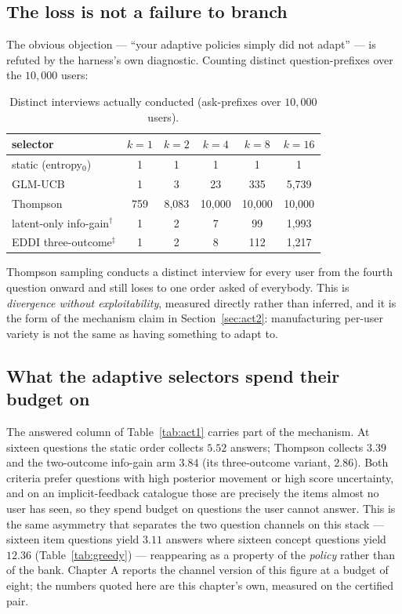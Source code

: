 \documentclass[11pt]{article}
\begin{document}
\subsection{The loss is not a failure to branch}

The obvious objection --- ``your adaptive policies simply did not adapt'' --- is refuted by the
harness's own diagnostic. Counting distinct question-prefixes over the $10{,}000$ users:

\begin{table}[h]
\centering
\caption{Distinct interviews actually conducted (ask-prefixes over $10{,}000$ users).}
\label{tab:prefixes}
\small
\begin{tabular}{lccccc}
\toprule
selector & $k{=}1$ & $k{=}2$ & $k{=}4$ & $k{=}8$ & $k{=}16$ \\
\midrule
static (entropy$_0$) & 1 & 1 & 1 & 1 & 1 \\
GLM-UCB & 1 & 3 & 23 & 335 & 5{,}739 \\
Thompson & 759 & 8{,}083 & 10{,}000 & 10{,}000 & 10{,}000 \\
latent-only info-gain$^\dagger$ & 1 & 2 & 7 & 99 & 1{,}993 \\
EDDI three-outcome$^\ddagger$ & 1 & 2 & 8 & 112 & 1{,}217 \\
\bottomrule
\end{tabular}
\end{table}

Thompson sampling conducts a distinct interview for every user from the fourth question onward and
still loses to one order asked of everybody. This is \emph{divergence without exploitability},
measured directly rather than inferred, and it is the form of the mechanism claim in
Section~\ref{sec:act2}: manufacturing per-user variety is not the same as having something to
adapt to.

\subsection{What the adaptive selectors spend their budget on}
\label{sec:answerability}

The answered column of Table~\ref{tab:act1} carries part of the mechanism. At sixteen questions the
static order collects $5.52$ answers; Thompson collects $3.39$ and the two-outcome info-gain arm
$3.84$ (its three-outcome variant, $2.86$). Both criteria
prefer questions with high posterior movement or high score uncertainty, and on an implicit-feedback
catalogue those are precisely the items almost no user has seen, so they spend budget on questions
the user cannot answer. This is the same asymmetry that separates the two question channels on this
stack --- sixteen item questions yield $3.11$ answers where sixteen concept questions yield $12.36$
(Table~\ref{tab:greedy}) --- reappearing as a property of the \emph{policy} rather than of the bank.
Chapter A reports the channel version of this figure at a budget of eight; the numbers quoted here
are this chapter's own, measured on the certified pair.
\end{document}
